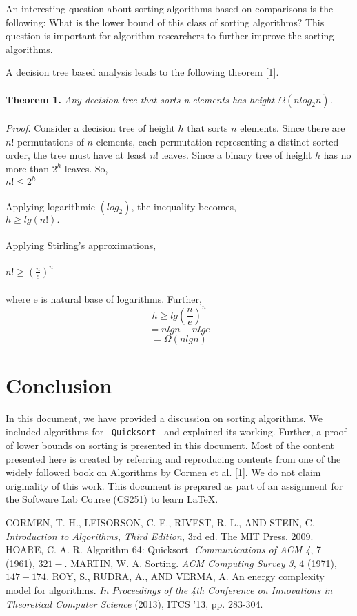 \documentclass[letter,11pt,twocolumn]{article}
\begin{document}
An interesting question about sorting algorithms
based on comparisons is the following: What is
the lower bound of this class of sorting algorithms? This question is important for algorithm
researchers to further improve the sorting algorithms.

A decision tree based analysis leads to the following theorem [1].\\\\
    \textbf{Theorem 1.} \textit{Any decision tree that sorts n elements has height $\Omega(nlog_2 n)$.}\\\\
    \textit{Proof}. Consider a decision tree of height $h$ that sorts $n$ elements. Since there are $n!$ permutations of $n$ elements, each permutation representing a distinct sorted order, the tree must have at least $n!$ leaves. Since a binary tree of height $h$ has no more than $2^h$ leaves. So,\\
    $n! \leq 2^h$ \\\\
    Applying logarithmic $(log_2 )$, the inequality becomes,\\
$h \geq lg(n!).$\\\\
Applying Stirling’s approximations,\\\\
$n! \geq \left(\frac{n}{e}\right)^n$\\\\
where e is natural base of logarithms. Further,
$$h \geq lg\left(\frac{n}{e}\right)^n$$
$$= nlg n - nlg e$$
$$= \Omega(nlg n)$$

\section{Conclusion}
In this document, we have provided a discussion on sorting algorithms. We included algorithms for
\texttt{ Quicksort } and explained its working. Further, a
proof of lower bounds on sorting is presented in this
document. Most of the content presented here is
created by referring and reproducing contents from
one of the widely followed book on Algorithms by Cormen et al. [1]. We do not claim originality of
this work. This document is prepared as part of an
assignment for the Software Lab Course (CS251) to
learn \LaTeX.

\begin{thebibliography}{25}
CORMEN, T. H., LEISORSON, C. E., RIVEST,
R. L., AND STEIN, C. \textit{Introduction to Algorithms, Third Edition,} 3rd ed. The MIT Press,
2009.
HOARE, C. A. R. Algorithm 64: Quicksort.
\textit{Communications of ACM 4}, 7 (1961), $321-$.
MARTIN, W. A. Sorting. \textit{ACM Computing
Survey 3}, 4 (1971), $147-174$.
ROY, S., RUDRA, A., AND VERMA, A. An energy complexity model for algorithms. \textit{In Proceedings of the 4th Conference on Innovations
in Theoretical Computer Science} (2013), ITCS
’13, pp. 283-304.

\end{thebibliography}

    
\end{document}
